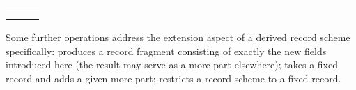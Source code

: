 \begin{isabellebody}
\begin{isamarkuptext}
  \medskip
  \begin{tabular}{lll}
    \isa{{\isachardoublequote}c\isactrlsub i{\isachardoublequote}} & \isa{{\isachardoublequote}{\isacharcolon}{\isacharcolon}{\isachardoublequote}} & \isa{{\isachardoublequote}{\isasymlparr}\isactrlvec b\ {\isacharcolon}{\isacharcolon}\ \isactrlvec {\isasymrho}{\isacharcomma}\ \isactrlvec c\ {\isacharcolon}{\isacharcolon}\ \isactrlvec {\isasymsigma}{\isacharcomma}\ {\isasymdots}\ {\isacharcolon}{\isacharcolon}\ {\isasymzeta}{\isasymrparr}\ {\isasymRightarrow}\ {\isasymsigma}\isactrlsub i{\isachardoublequote}} \\
    \isa{{\isachardoublequote}c\isactrlsub i{\isacharunderscore}update{\isachardoublequote}} & \isa{{\isachardoublequote}{\isacharcolon}{\isacharcolon}{\isachardoublequote}} & \isa{{\isachardoublequote}{\isasymsigma}\isactrlsub i\ {\isasymRightarrow}\ {\isasymlparr}\isactrlvec b\ {\isacharcolon}{\isacharcolon}\ \isactrlvec {\isasymrho}{\isacharcomma}\ \isactrlvec c\ {\isacharcolon}{\isacharcolon}\ \isactrlvec {\isasymsigma}{\isacharcomma}\ {\isasymdots}\ {\isacharcolon}{\isacharcolon}\ {\isasymzeta}{\isasymrparr}\ {\isasymRightarrow}\ {\isasymlparr}\isactrlvec b\ {\isacharcolon}{\isacharcolon}\ \isactrlvec {\isasymrho}{\isacharcomma}\ \isactrlvec c\ {\isacharcolon}{\isacharcolon}\ \isactrlvec {\isasymsigma}{\isacharcomma}\ {\isasymdots}\ {\isacharcolon}{\isacharcolon}\ {\isasymzeta}{\isasymrparr}{\isachardoublequote}} \\
    \isa{{\isachardoublequote}t{\isachardot}make{\isachardoublequote}} & \isa{{\isachardoublequote}{\isacharcolon}{\isacharcolon}{\isachardoublequote}} & \isa{{\isachardoublequote}{\isasymrho}\isactrlsub {\isadigit{1}}\ {\isasymRightarrow}\ {\isasymdots}\ {\isasymrho}\isactrlsub k\ {\isasymRightarrow}\ {\isasymsigma}\isactrlsub {\isadigit{1}}\ {\isasymRightarrow}\ {\isasymdots}\ {\isasymsigma}\isactrlsub n\ {\isasymRightarrow}\ {\isasymlparr}\isactrlvec b\ {\isacharcolon}{\isacharcolon}\ \isactrlvec {\isasymrho}{\isacharcomma}\ \isactrlvec c\ {\isacharcolon}{\isacharcolon}\ \isactrlvec {\isasymsigma}{\isasymrparr}{\isachardoublequote}} \\
  \end{tabular}
  \medskip

  \noindent Some further operations address the extension aspect of a
  derived record scheme specifically:  produces a
  record fragment consisting of exactly the new fields introduced here
  (the result may serve as a more part elsewhere); 
  takes a fixed record and adds a given more part;  restricts a record scheme to a fixed record.


\end{isamarkuptext}
\end{isabellebody}
